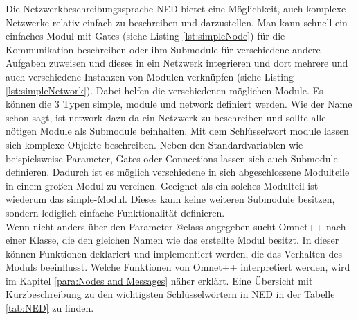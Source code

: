 Die Netzwerkbeschreibungssprache NED\cite{ned} bietet eine Möglichkeit, auch komplexe Netzwerke relativ einfach zu beschreiben und darzustellen. Man kann schnell ein einfaches Modul mit Gates (siehe Listing \ref{lst:simpleNode}) für die Kommunikation beschreiben oder ihm Submodule für verschiedene andere Aufgaben zuweisen und dieses in ein Netzwerk integrieren und dort mehrere und auch verschiedene Instanzen von Modulen verknüpfen (siehe Listing \ref{lst:simpleNetwork}).
\newline
Dabei helfen die verschiedenen möglichen Module. Es können die 3 Typen simple, module und network definiert werden. Wie der Name schon sagt, ist network dazu da ein Netzwerk zu beschreiben und sollte alle nötigen Module als Submodule beinhalten. 
\newline
Mit dem Schlüsselwort module lassen sich komplexe Objekte beschreiben. Neben den Standardvariablen wie beispielsweise Parameter, Gates oder Connections lassen sich auch Submodule definieren. Dadurch ist es möglich verschiedene in sich abgeschlossene Modulteile in einem großen Modul zu vereinen.
\newline
Geeignet als ein solches Modulteil ist wiederum das simple-Modul. Dieses kann keine weiteren Submodule besitzen, sondern lediglich einfache Funktionalität definieren.\\
Wenn nicht anders über den Parameter @class angegeben sucht Omnet++ nach einer Klasse, die den gleichen Namen wie das erstellte Modul besitzt. In dieser können Funktionen deklariert und implementiert werden, die das Verhalten des Moduls beeinflusst. Welche Funktionen von Omnet++ interpretiert werden, wird im Kapitel \ref{para:Nodes and Messages} näher erklärt.
Eine Übersicht mit Kurzbeschreibung zu den wichtigsten Schlüsselwörtern in NED in der Tabelle \ref{tab:NED} zu finden.

